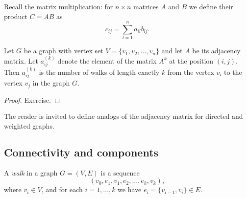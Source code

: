 \begin{page}


Recall the matrix multiplication: for $n \times n$ matrices $A$ and $B$ we define their product $C = AB$ as
\[
c_{ij} = \sum_{l=1}^n a_{il} b_{lj}.
\]


\end{page}

\begin{page}

\begin{thm}
Let $G$ be a graph with vertex set $V = \{v_1, v_2, \ldots, v_n\}$ and let $A$ be its adjacency matrix.
Let $a^{(k)}_{ij}$ denote the element of the matrix $A^k$ at the position $(i,j)$.
Then $a^{(k)}_{ij}$ is the number of walks of length exactly $k$ from the vertex $v_i$ to the vertex $v_j$ in the graph $G$.
\end{thm}

\end{page}

\begin{page}

\begin{proof}
Exercise.
\end{proof}

The reader is invited to define analogs of the adjacency matrix for directed and weighted graphs.



\end{page}

\begin{page}

\subsection{Connectivity and components}

\end{page}

\begin{page}

\begin{dfn}
A \emph{walk} in a graph $G = (V, E)$ is a sequence
\[
(v_0, e_1, v_1, e_2, \ldots, e_k, v_k),
\]
where $v_i \in V$, and for each $i = 1, \ldots, k$ we have $e_i = \{v_{i-1}, v_i\} \in E$.
\end{dfn}

\end{page}

